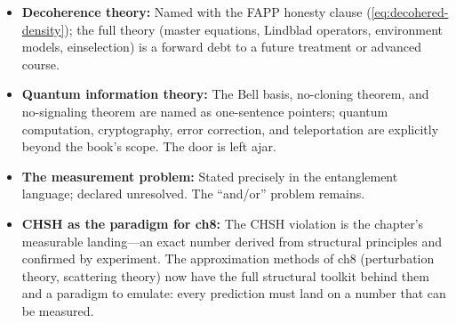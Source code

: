\begin{itemize}
\item \textbf{Decoherence theory:} Named with the FAPP honesty clause (\eqref{eq:decohered-density}); the full theory (master equations, Lindblad operators, environment models, einselection) is a forward debt to a future treatment or advanced course.

\item \textbf{Quantum information theory:} The Bell basis, no-cloning theorem, and no-signaling theorem are named as one-sentence pointers; quantum computation, cryptography, error correction, and teleportation are explicitly beyond the book's scope. The door is left ajar.

\item \textbf{The measurement problem:} Stated precisely in the entanglement language; declared unresolved. The ``and/or'' problem remains.

\item \textbf{CHSH as the paradigm for ch8:} The CHSH violation is the chapter's measurable landing---an exact number derived from structural principles and confirmed by experiment. The approximation methods of ch8 (perturbation theory, scattering theory) now have the full structural toolkit behind them and a paradigm to emulate: every prediction must land on a number that can be measured.
\end{itemize}

